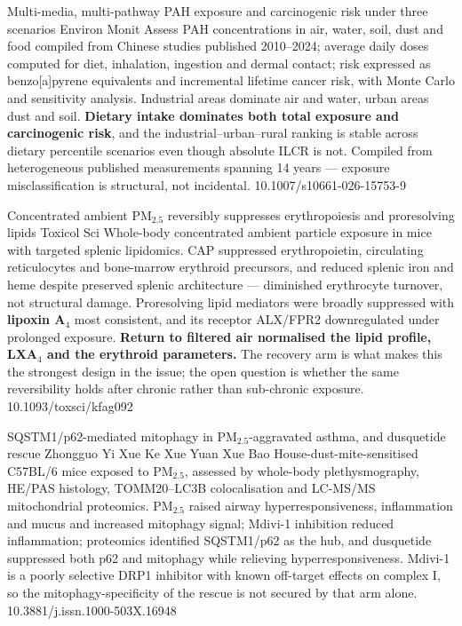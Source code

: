 \documentclass[10pt]{article}
\begin{document}
{Multi-media, multi-pathway PAH exposure and carcinogenic risk under three scenarios}
{Environ Monit Assess}
{PAH concentrations in air, water, soil, dust and food compiled from Chinese studies
published 2010--2024; average daily doses computed for diet, inhalation, ingestion and
dermal contact; risk expressed as benzo[a]pyrene equivalents and incremental lifetime
cancer risk, with Monte Carlo and sensitivity analysis. Industrial areas dominate air and
water, urban areas dust and soil. \textbf{Dietary intake dominates both total exposure and
carcinogenic risk}, and the industrial--urban--rural ranking is stable across dietary
percentile scenarios even though absolute ILCR is not. Compiled from heterogeneous
published measurements spanning 14 years --- exposure misclassification is structural, not
incidental.}
{10.1007/s10661-026-15753-9}


{Concentrated ambient PM$_{2.5}$ reversibly suppresses erythropoiesis and proresolving lipids}
{Toxicol Sci}
{Whole-body concentrated ambient particle exposure in mice with targeted splenic
lipidomics. CAP suppressed erythropoietin, circulating reticulocytes and bone-marrow
erythroid precursors, and reduced splenic iron and heme despite preserved splenic
architecture --- diminished erythrocyte turnover, not structural damage. Proresolving lipid
mediators were broadly suppressed with \textbf{lipoxin A$_4$} most consistent, and its
receptor ALX/FPR2 downregulated under prolonged exposure. \textbf{Return to filtered air
normalised the lipid profile, LXA$_4$ and the erythroid parameters.} The recovery arm is
what makes this the strongest design in the issue; the open question is whether the same
reversibility holds after chronic rather than sub-chronic exposure.}
{10.1093/toxsci/kfag092}

{SQSTM1/p62-mediated mitophagy in PM$_{2.5}$-aggravated asthma, and dusquetide rescue}
{Zhongguo Yi Xue Ke Xue Yuan Xue Bao}
{House-dust-mite-sensitised C57BL/6 mice exposed to PM$_{2.5}$, assessed by whole-body
plethysmography, HE/PAS histology, TOMM20--LC3B colocalisation and LC-MS/MS mitochondrial
proteomics. PM$_{2.5}$ raised airway hyperresponsiveness, inflammation and mucus and
increased mitophagy signal; Mdivi-1 inhibition reduced inflammation; proteomics identified
SQSTM1/p62 as the hub, and dusquetide suppressed both p62 and mitophagy while relieving
hyperresponsiveness. Mdivi-1 is a poorly selective DRP1 inhibitor with known off-target
effects on complex I, so the mitophagy-specificity of the rescue is not secured by that
arm alone.}
{10.3881/j.issn.1000-503X.16948}
\end{document}
